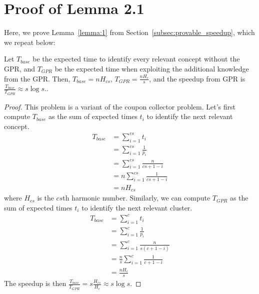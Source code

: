 

\section{Proof of Lemma 2.1}
\label{sec:proof}
Here, we prove Lemma~\ref{lemma:1} from Section~\ref{subsec:provable_speedup}, which we repeat below: 
\begin{lemma}[Lemma 2.1]
Let $T_{base}$ be the expected time to identify every relevant concept without the GPR, and $T_{GPR}$ be the expected time when exploiting the additional knowledge from the GPR. Then, $T_{base} = n H_{cs}$, $T_{GPR} = \frac{nH_{c}}{s}$, and the speedup from GPR is $\frac{T_{base}}{T_{GPR}} \approx s \log s$..
\end{lemma}
\begin{proof}
This problem is a variant of the coupon collector problem. Let's first compute $T_{base}$ as the sum of expected times $t_i$ to identify the next relevant concept. 
\begin{align}
    T_{base} &= \sum_{i=1}^{cs} t_i \\
             &= \sum_{i=1}^{cs} \frac{1}{p_i} \\
             &= \sum_{i=1}^{cs} \frac{n}{cs + 1 - i} \\
             &= n \sum_{i=1}^{cs} \frac{1}{cs + 1 - i} \\
             &= n H_{cs}
\end{align}
where $H_{cs}$ is the $cs$th harmonic number. Similarly, we can compute $T_{GPR}$ as the sum of expected times $t_i$ to identify the next relevant cluster.  
\begin{align}
    T_{base} &= \sum_{i=1}^{c} t_i \\
             &= \sum_{i=1}^{c} \frac{1}{p_i} \\
             &= \sum_{i=1}^{c} \frac{n}{s (c + 1 - i)} \\
             &= \frac{n}{s} \sum_{i=1}^{c} \frac{1}{c + 1 - i} \\
             &= \frac{nH_{c}}{s}
\end{align}
The speedup is then $\displaystyle \frac{T_{base}}{T_{GPR}} = s \frac{H_{cs}}{H_c} \approx s \log s$.
\end{proof}

